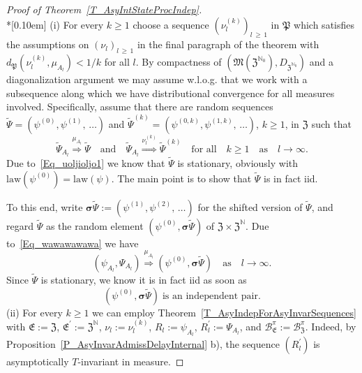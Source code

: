 \documentclass[10pt]{amsart}
\theoremstyle{definition}\newtheorem{defi}[theo]{Definition}\newtheorem{rema}[theo]{Remark}\newtheorem{exam}[theo]{Example}\newtheorem{exem}[theo]{Example}\newtheorem{nota}[theo]{Notation}
\newcommand{\clB}{\mathcal{B}}
\newcommand{\law}{\mathrm{law}}
\newcommand{\bfsig}{\boldsymbol{\sigma}}
\newcommand{\frkP}{\mathfrak{P}}
\newcommand{\frkE}{\mathfrak{E}}
\newcommand{\frkZ}{\mathfrak{Z}}
\newcommand{\frkM}{\mathfrak{M}}
\newcommand{\bbN}{\mathbb{N}}
\begin{document}
\begin{proof}[{Proof of Theorem~\ref{T_AsyIntStateProcIndep}}]\ \\*[0.10em]
\noindent (i) For every $k\geq1$ choose a sequence $(\nu_{l}^{(k)})_{l\,\geq\,1}$ in $\frkP$ which satisfies the assumptions on $(\nu_{l})_{l\,\geq\,1}$ in the final paragraph of the theorem with $d_{\frkP}(\nu_{l}^{(k)},\mu_{A_{l}})<1/k$ for all $l$. By compactness of $(\frkM(\frkZ^{\bbN_{0} }),D_{\frkZ^{\bbN_{0}}})$ and a diagonalization argument we may assume w.l.o.g. that we work with a subsequence along which we have distributional convergence for all measures involved. Specifically, assume that there are random sequences $\widetilde{\Psi}=(\psi^{(0)},\psi ^{(1)},\,\ldots)$ and $\widetilde{\Psi}^{(k)}=(\psi^{(0,k)},\psi^{(1,k)},\,\ldots)$, $k\geq1$, in $\frkZ$ such that
\begin{equation}\label{Eq_wawawawawa}
\widetilde{\Psi}_{A_{l}}\overset{\mu_{A_{l}}}{\Longrightarrow}\widetilde{\Psi } \quad\text{and}\quad\widetilde{\Psi}_{A_{l}}\overset{\nu_{l}^{(k)} }{\Longrightarrow}\widetilde{\Psi}^{(k)}\quad\text{for all}\quad k\geq1\quad\text{as}\quad l\rightarrow\infty. 
\end{equation}
Due to~\eqref{Eq_uoljioljo1} we know that $\widetilde{\Psi}$ is stationary, obviously with $\law(\psi^{(0)})=\law(\psi)$. The main point is to show that $\widetilde{\Psi}$ is in fact iid.



To this end, write $\bfsig\widetilde{\Psi}:=(\psi^{(1)},\psi ^{(2)},\,\ldots)$ for the shifted version of $\widetilde{\Psi}$, and regard $\widetilde{\Psi}$ as the random element $(\psi^{(0)},\bfsig\widetilde{\Psi})$ of $\frkZ\times\frkZ^{\bbN}$. Due to~\eqref{Eq_wawawawawa} we have
\begin{equation}
\left(\psi_{A_{l}},\Psi_{A_{l}}\right)\overset{\mu_{A_{l}}}{\Longrightarrow}\left(\psi ^{(0)},\bfsig\widetilde{\Psi}\right)\quad\text{as}\quad l\rightarrow\infty.
\end{equation}
Since $\widetilde{\Psi}$ is stationary, we know it is in fact iid as soon as
\begin{equation}\label{Eq_FirstEntraIndependent}
\left(\psi^{(0)},\bfsig\widetilde{\Psi}\right)\;\text{is an independent pair}.
\end{equation}
(ii) For every $k\geq1$ we can employ Theorem~\ref{T_AsyIndepForAsyInvarSequences} with $\frkE:=\frkZ$, $\frkE^{\prime}:=\frkZ^{\bbN}$, $\nu_{l}:=\nu_{l}^{(k)}$, $R_{l}:=\psi_{A_{l}}$, $R_{l}^{\prime}:=\Psi_{A_{l}}$, and $\clB _{\frkE}^{\pi}:=\clB_{\frkZ}^{\pi}$. Indeed, by Proposition~\ref{P_AsyInvarAdmissDelayInternal} b), the sequence $(R_{l}^{\prime})$ is asymptotically $T$-invariant in measure.


\end{proof}
\end{document}
